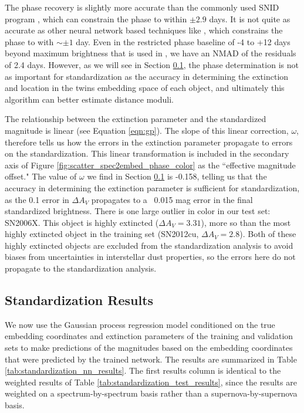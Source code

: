 The phase recovery is slightly more accurate than the commonly used SNID program \citep{blondin_determining_2007}, which can constrain the phase to within $\pm 2.9$ days. It is not quite as accurate as other neural network based techniques like \citet{stahl_deepsip_2020}, which constrains the phase to with $\sim\pm 1$ day. Even in the restricted phase baseline of -4 to +12 days beyond maximum brightness that is used in \citet{stahl_deepsip_2020}, we have an NMAD of the residuals of 2.4 days. However, as we will see in Section \ref{sec:standardization}, the phase determination is not as important for standardization as the accuracy in determining the extinction and location in the twins embedding space of each object, and ultimately this algorithm can better estimate distance moduli.

The relationship between the extinction parameter and the standardized magnitude is linear (see Equation \ref{eqn:gp}). The slope of this linear correction, $\omega$, therefore tells us how the errors in the extinction parameter propagate to errors on the standardization. This linear transformation is included in the secondary axis of Figure \ref{fig:scatter_spec2embed_phase_color} as the ``effective magnitude offset." The value of $\omega$ we find in Section \ref{sec:standardization} is -0.158, telling us that the accuracy in determining the extinction parameter is sufficient for standardization, as the 0.1 error in $\Delta A_V$ propagates to a ~0.015 mag error in the final standardized brightness. There is one large outlier in color in our test set: SN2006X. This object is highly extincted ($\Delta A_V=3.31$), more so than the most highly extincted object in the training set (SN2012cu, $\Delta A_V=2.8$). Both of these highly extincted objects are excluded from the standardization analysis to avoid biases from uncertainties in interstellar dust properties, so the errors here do not propagate to the standardization analysis.

\subsection{Standardization Results} 
\label{sec:standardization}
We now use the Gaussian process regression model conditioned on the true embedding coordinates and extinction parameters of the training and validation sets to make predictions of the magnitudes based on the embedding coordinates that were predicted by the trained \stoe{} network. The results are summarized in Table \ref{tab:standardization_nn_results}. The first results column is identical to the weighted results of Table \ref{tab:standardization_test_results}, since the results are weighted on a spectrum-by-spectrum basis rather than a supernova-by-supernova basis.


